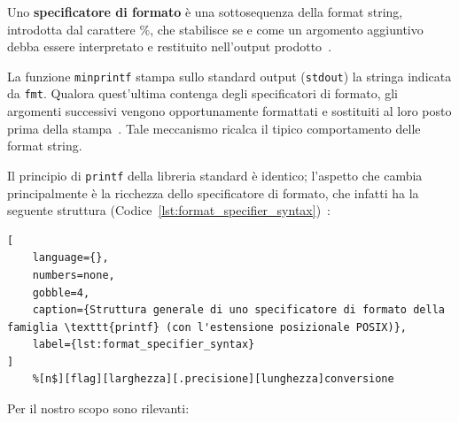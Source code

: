 \begin{defn}\label{def:specificatore}
    Uno \textbf{specificatore di formato} è una sottosequenza della format string, introdotta dal carattere \%, che stabilisce se e come un argomento aggiuntivo debba essere interpretato e restituito nell'output prodotto~\cite{cplusplusprintf}.
\end{defn}

La funzione \texttt{minprintf} stampa sullo standard output (\texttt{stdout}) la stringa indicata da \texttt{fmt}. Qualora quest'ultima contenga degli specificatori di formato, gli argomenti successivi vengono opportunamente formattati e sostituiti al loro posto prima della stampa~\cite{cplusplusprintf}. Tale meccanismo ricalca il tipico comportamento delle format string.

Il principio di \texttt{printf} della libreria standard è identico; l'aspetto che cambia principalmente è la ricchezza dello specificatore di formato, che infatti ha la seguente struttura (Codice~\ref{lst:format_specifier_syntax})~\cite{man3printf,cplusplusprintf}:
\begin{lstlisting}[
    language={},
    numbers=none,
    gobble=4,
    caption={Struttura generale di uno specificatore di formato della famiglia \texttt{printf} (con l'estensione posizionale POSIX)},
    label={lst:format_specifier_syntax}
]
    %[n$][flag][larghezza][.precisione][lunghezza]conversione
\end{lstlisting}
Per il nostro scopo sono rilevanti:
